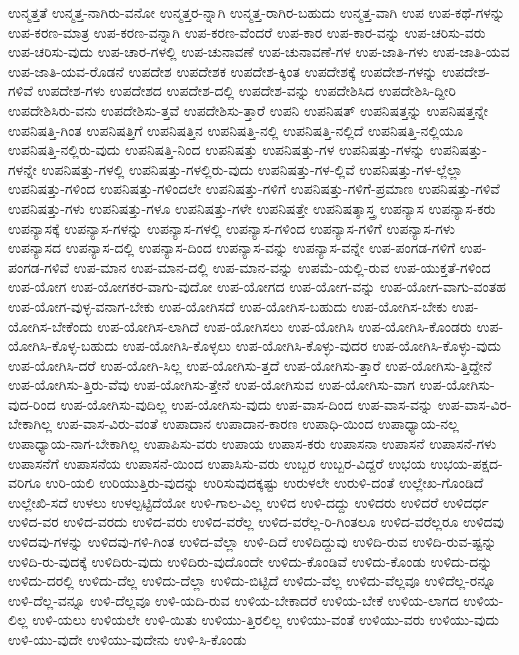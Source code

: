 {ಉನ್ಮತ್ತತೆ
ಉನ್ಮತ್ತ-ನಾಗಿರು-ವನೋ
ಉನ್ಮತ್ತರ-ನ್ನಾಗಿ
ಉನ್ಮತ್ತ-ರಾಗಿರ-ಬಹುದು
ಉನ್ಮತ್ತ-ವಾಗಿ
ಉಪ
ಉಪ-ಕಥೆ-ಗಳನ್ನು
ಉಪ-ಕರಣ-ಮಾತ್ರ
ಉಪ-ಕರಣ-ವನ್ನಾಗಿ
ಉಪ-ಕರಣ-ವೆಂದರೆ
ಉಪ-ಕಾರ
ಉಪ-ಕಾರ-ವನ್ನು
ಉಪ-ಚರಿಸು-ವರು
ಉಪ-ಚರಿಸು-ವುದು
ಉಪ-ಚಾರ-ಗಳಲ್ಲಿ
ಉಪ-ಚುನಾವಣೆ
ಉಪ-ಚುನಾವಣೆ-ಗಳ
ಉಪ-ಜಾತಿ-ಗಳು
ಉಪ-ಜಾತಿ-ಯವ
ಉಪ-ಜಾತಿ-ಯವ-ರೊಡನೆ
ಉಪದೇಶ
ಉಪದೇಶಕ
ಉಪದೇಶ-ಕ್ಕಿಂತ
ಉಪದೇಶಕ್ಕೆ
ಉಪದೇಶ-ಗಳನ್ನು
ಉಪದೇಶ-ಗಳಿವೆ
ಉಪದೇಶ-ಗಳು
ಉಪದೇಶದ
ಉಪದೇಶ-ದಲ್ಲಿ
ಉಪದೇಶ-ವನ್ನು
ಉಪದೇಶಿಸಿದ
ಉಪದೇಶಿಸಿ-ದ್ದೀರಿ
ಉಪದೇಶಿಸಿರು-ವನು
ಉಪದೇಶಿಸು-ತ್ತವೆ
ಉಪದೇಶಿಸು-ತ್ತಾರೆ
ಉಪನಿ
ಉಪನಿಷತ್
ಉಪನಿಷತ್ತನ್ನು
ಉಪನಿಷತ್ತನ್ನೇ
ಉಪನಿಷತ್ತಿ-ಗಿಂತ
ಉಪನಿಷತ್ತಿಗೆ
ಉಪನಿಷತ್ತಿನ
ಉಪನಿಷತ್ತಿ-ನಲ್ಲಿ
ಉಪನಿಷತ್ತಿ-ನಲ್ಲಿದೆ
ಉಪನಿಷತ್ತಿ-ನಲ್ಲಿಯೂ
ಉಪನಿಷತ್ತಿ-ನಲ್ಲಿರು-ವುದು
ಉಪನಿಷತ್ತಿ-ನಿಂದ
ಉಪನಿಷತ್ತು
ಉಪನಿಷತ್ತು-ಗಳ
ಉಪನಿಷತ್ತು-ಗಳನ್ನು
ಉಪನಿಷತ್ತು-ಗಳನ್ನೇ
ಉಪನಿಷತ್ತು-ಗಳಲ್ಲಿ
ಉಪನಿಷತ್ತು-ಗಳಲ್ಲಿರು-ವುದು
ಉಪನಿಷತ್ತು-ಗಳ-ಲ್ಲಿವೆ
ಉಪನಿಷತ್ತು-ಗಳ-ಲ್ಲೆಲ್ಲಾ
ಉಪನಿಷತ್ತು-ಗಳಿಂದ
ಉಪನಿಷತ್ತು-ಗಳಿಂದಲೇ
ಉಪನಿಷತ್ತು-ಗಳಿಗೆ
ಉಪನಿಷತ್ತು-ಗಳಿಗೆ-ಪ್ರಮಾಣ
ಉಪನಿಷತ್ತು-ಗಳಿವೆ
ಉಪನಿಷತ್ತು-ಗಳು
ಉಪನಿಷತ್ತು-ಗಳೂ
ಉಪನಿಷತ್ತು-ಗಳೇ
ಉಪನಿಷತ್ತೇ
ಉಪನಿಷತ್ಶಾಸ್ತ್ರ
ಉಪನ್ಯಾಸ
ಉಪನ್ಯಾಸ-ಕರು
ಉಪನ್ಯಾಸಕ್ಕೆ
ಉಪನ್ಯಾಸ-ಗಳನ್ನು
ಉಪನ್ಯಾಸ-ಗಳಲ್ಲಿ
ಉಪನ್ಯಾಸ-ಗಳಿಂದ
ಉಪನ್ಯಾಸ-ಗಳಿಗೆ
ಉಪನ್ಯಾಸ-ಗಳು
ಉಪನ್ಯಾಸದ
ಉಪನ್ಯಾಸ-ದಲ್ಲಿ
ಉಪನ್ಯಾಸ-ದಿಂದ
ಉಪನ್ಯಾಸ-ವನ್ನು
ಉಪನ್ಯಾಸ-ವನ್ನೇ
ಉಪ-ಪಂಗಡ-ಗಳಿಗೆ
ಉಪ-ಪಂಗಡ-ಗಳಿವೆ
ಉಪ-ಮಾನ
ಉಪ-ಮಾನ-ದಲ್ಲಿ
ಉಪ-ಮಾನ-ವನ್ನು
ಉಪಮೆ-ಯಲ್ಲಿ-ರುವ
ಉಪ-ಯುಕ್ತತೆ-ಗಳಿಂದ
ಉಪ-ಯೋಗ
ಉಪ-ಯೋಗಕರ-ವಾಗು-ವುದೋ
ಉಪ-ಯೋಗದ
ಉಪ-ಯೋಗ-ವನ್ನು
ಉಪ-ಯೋಗ-ವಾಗು-ವಂತಹ
ಉಪ-ಯೋಗ-ವುಳ್ಳ-ವನಾಗ-ಬೇಕು
ಉಪ-ಯೋಗಿಸದೆ
ಉಪ-ಯೋಗಿಸ-ಬಹುದು
ಉಪ-ಯೋಗಿಸ-ಬೇಕು
ಉಪ-ಯೋಗಿಸ-ಬೇಕೆಂದು
ಉಪ-ಯೋಗಿಸ-ಲಾಗಿದೆ
ಉಪ-ಯೋಗಿಸಲು
ಉಪ-ಯೋಗಿಸಿ
ಉಪ-ಯೋಗಿಸಿ-ಕೊಂಡರು
ಉಪ-ಯೋಗಿಸಿ-ಕೊಳ್ಳ-ಬಹುದು
ಉಪ-ಯೋಗಿಸಿ-ಕೊಳ್ಳಲು
ಉಪ-ಯೋಗಿಸಿ-ಕೊಳ್ಳು-ವುದರ
ಉಪ-ಯೋಗಿಸಿ-ಕೊಳ್ಳು-ವುದು
ಉಪ-ಯೋಗಿಸಿ-ದರೆ
ಉಪ-ಯೋಗಿ-ಸಿಲ್ಲ
ಉಪ-ಯೋಗಿಸು-ತ್ತದೆ
ಉಪ-ಯೋಗಿಸು-ತ್ತಾರೆ
ಉಪ-ಯೋಗಿಸು-ತ್ತಿದ್ದೇನೆ
ಉಪ-ಯೋಗಿಸು-ತ್ತಿರು-ವೆವು
ಉಪ-ಯೋಗಿಸು-ತ್ತೇನೆ
ಉಪ-ಯೋಗಿಸುವ
ಉಪ-ಯೋಗಿಸು-ವಾಗ
ಉಪ-ಯೋಗಿಸು-ವುದ-ರಿಂದ
ಉಪ-ಯೋಗಿಸು-ವುದಿಲ್ಲ
ಉಪ-ಯೋಗಿಸು-ವುದು
ಉಪ-ವಾಸ-ದಿಂದ
ಉಪ-ವಾಸ-ವನ್ನು
ಉಪ-ವಾಸ-ವಿರ-ಬೇಕಾಗಿಲ್ಲ
ಉಪ-ವಾಸ-ವಿರು-ವಂತೆ
ಉಪಾದಾನ
ಉಪಾದಾನ-ಕಾರಣ
ಉಪಾಧಿ-ಯಿಂದ
ಉಪಾಧ್ಯಾಯ-ನಲ್ಲ
ಉಪಾಧ್ಯಾಯ-ನಾಗ-ಬೇಕಾಗಿಲ್ಲ
ಉಪಾಪಿಸು-ವರು
ಉಪಾಯ
ಉಪಾಸ-ಕರು
ಉಪಾಸನಾ
ಉಪಾಸನೆ
ಉಪಾಸನೆ-ಗಳು
ಉಪಾಸನೆಗೆ
ಉಪಾಸನೆಯ
ಉಪಾಸನೆ-ಯಿಂದ
ಉಪಾಸಿಸು-ವರು
ಉಬ್ಬರ
ಉಬ್ಬರ-ವಿದ್ದರೆ
ಉಭಯ
ಉಭಯ-ಪಕ್ಷದ-ವರಿಗೂ
ಉರಿ-ಯಲಿ
ಉರಿಯುತ್ತಿರು-ವುದನ್ನು
ಉರಿಸುವುದಕ್ಕಷ್ಟು
ಉರುಳಲೇ
ಉರುಳಿ-ದಂತೆ
ಉಲ್ಲೇಖ-ಗೊಂಡಿದೆ
ಉಲ್ಲೇಖಿ-ಸದೆ
ಉಳಲು
ಉಳಲ್ಪಟ್ಟಿದೆಯೋ
ಉಳಿ-ಗಾಲ-ವಿಲ್ಲ
ಉಳಿದ
ಉಳಿ-ದದ್ದು
ಉಳಿದರು
ಉಳಿದರೆ
ಉಳಿದರ್ಧ
ಉಳಿದ-ವರ
ಉಳಿದ-ವರದು
ಉಳಿದ-ವರು
ಉಳಿದ-ವರೆಲ್ಲ
ಉಳಿದ-ವರೆಲ್ಲ-ರಿ-ಗಿಂತಲೂ
ಉಳಿದ-ವರೆಲ್ಲರೂ
ಉಳಿದವು
ಉಳಿದವು-ಗಳನ್ನು
ಉಳಿದವು-ಗಳಿ-ಗಿಂತ
ಉಳಿದ-ವೆಲ್ಲಾ
ಉಳಿ-ದಿದೆ
ಉಳಿದಿದ್ದುವು
ಉಳಿದಿ-ರುವ
ಉಳಿದಿ-ರುವ-ಷ್ಟನ್ನು
ಉಳಿದಿ-ರು-ವುದಕ್ಕೆ
ಉಳಿದಿರು-ವುದು
ಉಳಿದಿರು-ವುದೊಂದೇ
ಉಳಿದು-ಕೊಂಡಿವೆ
ಉಳಿದು-ಕೊಂಡು
ಉಳಿದು-ದನ್ನು
ಉಳಿದು-ದರಲ್ಲಿ
ಉಳಿದು-ದೆಲ್ಲ
ಉಳಿದು-ದೆಲ್ಲಾ
ಉಳಿದು-ಬಿಟ್ಟಿದೆ
ಉಳಿದು-ವೆಲ್ಲ
ಉಳಿದು-ವೆಲ್ಲವೂ
ಉಳಿದೆಲ್ಲ-ರನ್ನೂ
ಉಳಿ-ದೆಲ್ಲ-ವನ್ನೂ
ಉಳಿ-ದೆಲ್ಲವೂ
ಉಳಿ-ಯದಿ-ರುವ
ಉಳಿಯ-ಬೇಕಾದರೆ
ಉಳಿಯ-ಬೇಕೆ
ಉಳಿಯ-ಲಾಗದ
ಉಳಿಯ-ಲಿಲ್ಲ
ಉಳಿ-ಯಲು
ಉಳಿಯಲೇ
ಉಳಿ-ಯಿತು
ಉಳಿಯು-ತ್ತಿರಲಿಲ್ಲ
ಉಳಿಯು-ವಂತೆ
ಉಳಿಯು-ವರು
ಉಳಿಯು-ವುದು
ಉಳಿ-ಯು-ವುದೇ
ಉಳಿಯು-ವುದೇನು
ಉಳಿ-ಸಿ-ಕೊಂಡು
}
